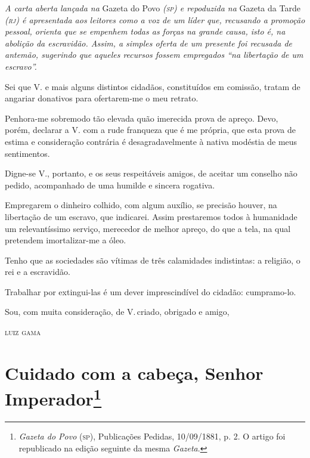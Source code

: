 \begin{resumo}
\emph{A carta aberta lançada na} Gazeta do Povo \emph{(\textsc{sp}) e repoduzida
na} Gazeta da Tarde \emph{(\textsc{rj}) é apresentada aos leitores como a voz de
um líder que, recusando a promoção pessoal, orienta que se empenhem todas
as forças na grande causa, isto é, na abolição da escravidão. Assim, a
simples oferta de um presente foi recusada de antemão, sugerindo que
aqueles recursos fossem empregados ``na libertação de um escravo''. }
\end{resumo}

Sei que V. e mais alguns distintos cidadãos, constituídos em comissão, tratam de angariar donativos para ofertarem-me o meu retrato.

Penhora-me sobremodo tão elevada quão imerecida prova de apreço. Devo,
porém, declarar a V. com a rude franqueza que é me própria, que esta
prova de estima e consideração contrária é desagradavelmente à nativa
modéstia de meus sentimentos.

Digne-se V., portanto, e os seus respeitáveis amigos, de aceitar um
conselho não pedido, acompanhado de uma humilde e sincera rogativa.

Empregarem o dinheiro colhido, com algum auxílio, se precisão houver, na
libertação de um escravo, que indicarei. Assim prestaremos todos à
humanidade um relevantíssimo serviço, merecedor de melhor apreço, do que
a tela, na qual pretendem imortalizar-me a óleo.

Tenho que as sociedades são vítimas de três calamidades indistintas: a
religião, o rei e a escravidão.

Trabalhar por extingui-las é um dever imprescindível do cidadão:
cumpramo-lo.

Sou, com muita consideração, de V.\,criado, obrigado e amigo,\medskip

\hfill\textsc{luiz gama}

\chapter{Cuidado com a cabeça, Senhor Imperador\footnote{
\emph{Gazeta do Povo} (\textsc{sp}), Publicações Pedidas, 10/09/1881, p. 2. O
  artigo foi republicado na edição seguinte da mesma \emph{Gazeta}.}}

